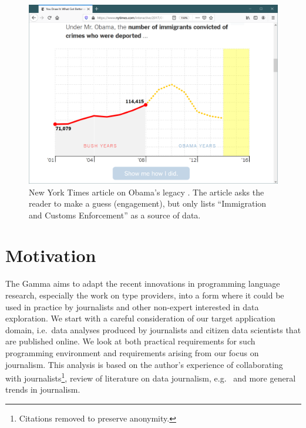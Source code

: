 \documentclass{sigchi}
\begin{document}
\begin{figure}
\includegraphics[width=1\columnwidth]{figures/nyt}
\caption{New York Times article on Obama's legacy \cite{youdraw}. The article asks the reader to make a guess
(engagement), but only lists ``Immigration and Customs Enforcement'' as a source of data.}
\label{fig:nyt}
\end{figure}

\section{Motivation}
\label{sec:motivation}

The Gamma aims to adapt the recent innovations in programming language research, especially the
work on type providers, into a form where it could be used in practice by journalists and other
non-expert interested in data exploration. We start with a careful consideration of our target
application domain, i.e.~data analyses produced by journalists and citizen data scientists that
are published online. We look at both practical requirements for such programming environment
and requirements arising from our focus on journalism. This analysis is based on the author's
experience of collaborating with journalists\footnote{Citations removed to preserve anonymity.},
review of literature on data journalism, e.g.~\cite{ddj,edcj17,edcj18} and more general trends in
journalism.
\end{document}
